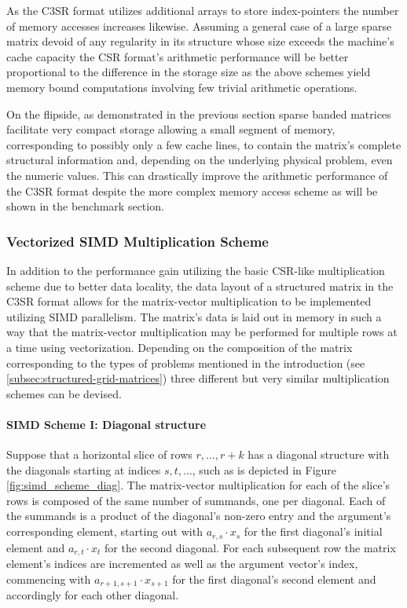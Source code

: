 \documentclass{article}
\begin{document}
      As the C3SR format utilizes additional arrays to store index-pointers the number of memory accesses increases likewise. Assuming a general case of a large sparse matrix devoid of any regularity in its structure whose size exceeds the machine's cache capacity the CSR format's arithmetic performance will be better proportional to the difference in the storage size as the above schemes yield memory bound computations involving few trivial arithmetic operations.

      On the flipside, as demonstrated in the previous section sparse banded matrices facilitate very compact storage allowing a small segment of memory, corresponding to possibly only a few cache lines, to contain the matrix's complete structural information and, depending on the underlying physical problem, even the numeric values. This can drastically improve the arithmetic performance of the C3SR format despite the more complex memory access scheme as will be shown in the benchmark section.

    \subsubsection{Vectorized SIMD Multiplication Scheme} \label{subsubsec:vectorized-simd-multiplication-scheme}

      In addition to the performance gain utilizing the basic CSR-like multiplication scheme due to better data locality, the data layout of a structured matrix in the C3SR format allows for the matrix-vector multiplication to be implemented utilizing SIMD parallelism. The matrix's data is laid out in memory in such a way that the matrix-vector multiplication may be performed for multiple rows at a time using vectorization. Depending on the composition of the matrix corresponding to the types of problems mentioned in the introduction (see \ref{subsec:structured-grid-matrices}) three different but very similar multiplication schemes can be devised.

      \paragraph{SIMD Scheme I: Diagonal structure}

      Suppose that a horizontal slice of rows $r, \ldots, r+k$ has a diagonal structure with the diagonals starting at indices $s, t, \ldots $, such as is depicted in Figure \ref{fig:simd_scheme_diag}. The matrix-vector multiplication for each of the slice's rows is composed of the same number of summands, one per diagonal. Each of the summands is a product of the diagonal's non-zero entry and the argument's corresponding element, starting out with $a_{r,s} \cdot x_s$ for the first diagonal's initial element and $a_{r,t} \cdot x_t$ for the second diagonal. For each subsequent row the matrix element's indices are incremented as well as the argument vector's index, commencing with $a_{r+1, s+1} \cdot x_{s+1}$ for the first diagonal's second element and accordingly for each other diagonal.
\end{document}

